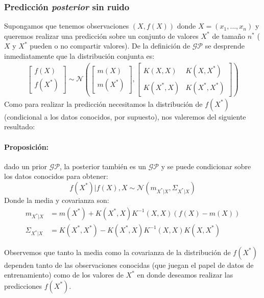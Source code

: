 \documentclass[a4paper]{article}
\newcommand{\gp}{\ensuremath{\mathcal{GP}}}
\begin{document}
\subsubsection{Predicción \emph{posterior} sin ruido}
Supongamos que tenemos observaciones $(X,f(X))$ donde $X=\left(x_1,\dots,x_n\right)$ y queremos realizar una predicción sobre un conjunto de valores $X^*$ de tamaño $n^*$ ($X$ y $X^*$ pueden o no compartir valores). De la definición de $\gp$ se desprende inmediatamente que la distribución conjunta es:
\begin{align}
	\begin{bmatrix} f(X) \\ f(X^*)  \end{bmatrix}
	\sim \mathcal{N} \left(
	\begin{bmatrix} m(X) \\ m(X^*)  \end{bmatrix}, 
	\begin{bmatrix}
		K(X, X) & K(X, X^*) \\ K(X^*, X) & K(X^*, X^*)
	\end{bmatrix}
	\right)
\end{align}
Como para realizar la predicción necesitamos la distribución de $f(X^*)$ (condicional a los datos conocidos, por supuesto), nos valeremos del siguiente resultado:

\paragraph{Proposición:} dado un prior $\gp$, la posterior también es un $\gp$ y se puede condicionar sobre los datos conocidos para obtener:
\begin{equation}
	f(X^*) | f(X), X  \sim \mathcal{N}(m_{X^*|X}, \Sigma_{X^*|X}) \label{eq:gp_post}
\end{equation}
Donde la media y covarianza son:
\begin{align}
	m_{X^*|X} & = m(X^*) + K(X^*, X)K^{-1}(X, X) (f(X) - m(X))\\
	\Sigma_{X^*|X} & = K(X^*, X^*) - K(X^*, X)K^{-1}(X, X) K(X, X^*)
\end{align}


Observemos que tanto la media como la covarianza de la distribución de $f(X^*)$ dependen tanto de las observaciones conocidas (que juegan el papel de datos de entrenamiento) como de los valores de $X^*$ en donde deseamos realizar las predicciones $f(X^*)$.
\end{document}
